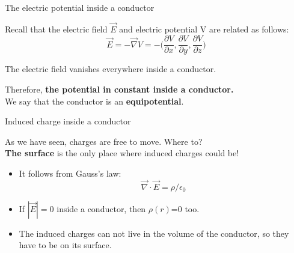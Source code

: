 \begin{frame}{The electric potential inside a conductor}

Recall that the electric field $\vec{E}$ and electric potential V are related as follows:
\begin{equation*}
  \vec{E} =
     - \vec{\nabla} V =
     - \Big(
          \frac{\partial V}{\partial x},
          \frac{\partial V}{\partial y},
          \frac{\partial V}{\partial z}
       \Big)
\end{equation*}

\vspace{0.3cm}

The electric field vanishes everywhere inside a conductor.\\
\vspace{0.3cm}

Therefore, {\textbf{the potential in constant inside a conductor.}}\\
\vspace{0.2cm}
We say that the conductor is an {\bf equipotential}.\\

\end{frame}

%
%
%

\begin{frame}{Induced charge inside a conductor}

As we have seen, charges are free to move. Where to?\\
\vspace{0.3cm}
{\bf The surface} is the only place where induced charges could be!
\begin{itemize}
  \item It follows from Gauss's law:
    \begin{equation*}
       \vec{\nabla} \cdot \vec{E} = {\rho}/\epsilon_0
    \end{equation*}
  \item If $|\vec{E}|=0$ inside a conductor, then $\rho(r)$=0 too.
  \item The induced charges can not live in the volume of the conductor, so they have to be on its surface.
\end{itemize}


\end{frame}


%
%
%

